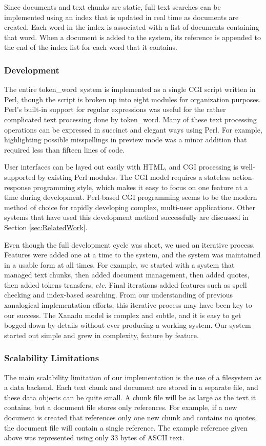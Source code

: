 \documentclass{acm_proc_article-sp}
\newcommand{\tw}{token\_word}
\begin{document}
Since documents and text chunks are static, full text searches can be implemented using an index that is updated in real time as documents are created.
Each word in the index is associated with a list of documents containing that word.
When a document is added to the system, its reference is appended to the end of the index list for each word that it contains.


\subsubsection{Development}
The entire \tw \   system is implemented as a single CGI script written in Perl, though the script is broken up into eight modules for organization purposes.
Perl's built-in support for regular expressions was useful for the rather complicated text processing done by \tw.
Many of these text processing operations can be expressed in succinct and elegant ways using Perl.
For example, highlighting possible misspellings in preview mode was a minor addition that required less than fifteen lines of code.

User interfaces can be layed out easily with HTML, and CGI processing is well-supported by existing Perl modules.
The CGI model requires a stateless action-response programming style, which makes it easy to focus on one feature at a time during development.
Perl-based CGI programming seems to be the modern method of choice for rapidly developing complex, multi-user applications.
Other systems that have used this development method successfully are discussed in Section \ref{sec:RelatedWork}.

Even though the full development cycle was short, we used an iterative process.
Features were added one at a time to the system, and the system was maintained in a usable form at all times.
For example, we started with a system that managed text chunks, then added document management, then added quotes, then added tokens transfers, {\it etc.}
Final iterations added features such as spell checking and index-based searching.
From our understanding of previous xanalogical implementation efforts, this iterative process may have been key to our success.
The Xanadu model is complex and subtle, and it is easy to get bogged down by details without ever producing a working system.
Our system started out simple and grew in complexity, feature by feature.


\subsubsection{Scalability Limitations}
The main scalability limitation of our implementation is the use of a filesystem as a data backend.
Each text chunk and document are stored in a separate file, and these data objects can be quite small.
A chunk file will be as large as the text it contains, but a document file stores only references.
For example, if a new document is created that references only one new chunk and contains no quotes, the document file will contain a single reference.
The example reference given above was represented using only 33 bytes of ASCII text.
\end{document}
